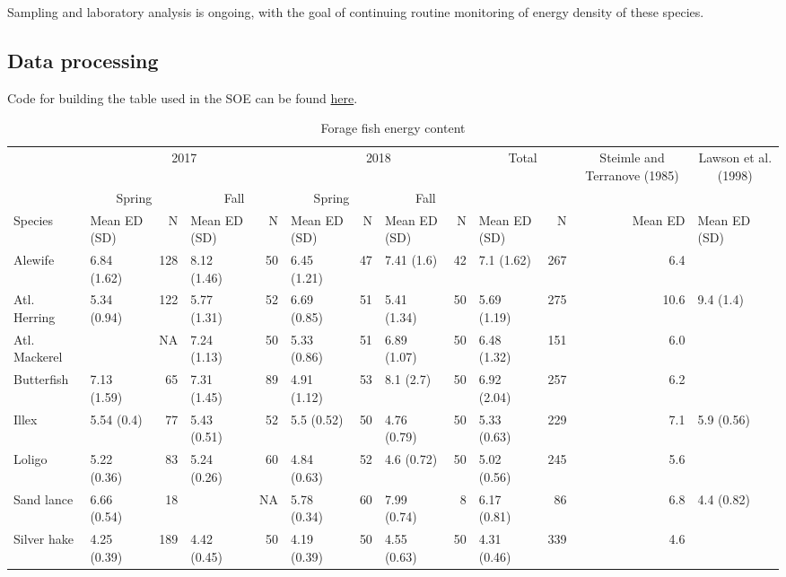 \documentclass[
]{book}
\begin{document}
Sampling and laboratory analysis is ongoing, with the goal of continuing routine monitoring of energy density of these species.

\hypertarget{data-processing-11}{%
\subsection{Data processing}\label{data-processing-11}}

Code for building the table used in the SOE can be found
\href{https://github.com/NOAA-EDAB/ecodata/blob/master/chunk-scripts/macrofauna.Rmd-forage.R}{here}.

\begin{table}

\caption{\label{tab:tab}Forage fish energy content}
\centering
\fontsize{9}{11}\selectfont
\begin{tabular}[t]{l|l|r|l|r|l|r|l|r|l|r|r|l}
\hline
\multicolumn{1}{c|}{ } & \multicolumn{4}{c|}{2017} & \multicolumn{4}{c|}{2018} & \multicolumn{2}{c|}{Total} & \multicolumn{1}{c|}{Steimle and Terranove (1985)} & \multicolumn{1}{c}{Lawson et al. (1998)} \\
\cline{2-5} \cline{6-9} \cline{10-11} \cline{12-12} \cline{13-13}
\multicolumn{1}{c|}{ } & \multicolumn{2}{c|}{Spring} & \multicolumn{2}{c|}{Fall} & \multicolumn{2}{c|}{Spring} & \multicolumn{2}{c|}{Fall} & \multicolumn{4}{c}{ } \\
\cline{2-3} \cline{4-5} \cline{6-7} \cline{8-9}
Species & Mean ED (SD) & N & Mean ED (SD) & N & Mean ED (SD) & N & Mean ED (SD) & N & Mean ED (SD) & N & Mean ED & Mean ED (SD)\\
\hline
Alewife & 6.84 (1.62) & 128 & 8.12 (1.46) & 50 & 6.45 (1.21) & 47 & 7.41 (1.6) & 42 & 7.1 (1.62) & 267 & 6.4 & \\
\hline
Atl. Herring & 5.34 (0.94) & 122 & 5.77 (1.31) & 52 & 6.69 (0.85) & 51 & 5.41 (1.34) & 50 & 5.69 (1.19) & 275 & 10.6 & 9.4 (1.4)\\
\hline
Atl. Mackerel &  & NA & 7.24 (1.13) & 50 & 5.33 (0.86) & 51 & 6.89 (1.07) & 50 & 6.48 (1.32) & 151 & 6.0 & \\
\hline
Butterfish & 7.13 (1.59) & 65 & 7.31 (1.45) & 89 & 4.91 (1.12) & 53 & 8.1 (2.7) & 50 & 6.92 (2.04) & 257 & 6.2 & \\
\hline
Illex & 5.54 (0.4) & 77 & 5.43 (0.51) & 52 & 5.5 (0.52) & 50 & 4.76 (0.79) & 50 & 5.33 (0.63) & 229 & 7.1 & 5.9 (0.56)\\
\hline
Loligo & 5.22 (0.36) & 83 & 5.24 (0.26) & 60 & 4.84 (0.63) & 52 & 4.6 (0.72) & 50 & 5.02 (0.56) & 245 & 5.6 & \\
\hline
Sand lance & 6.66 (0.54) & 18 &  & NA & 5.78 (0.34) & 60 & 7.99 (0.74) & 8 & 6.17 (0.81) & 86 & 6.8 & 4.4 (0.82)\\
\hline
Silver hake & 4.25 (0.39) & 189 & 4.42 (0.45) & 50 & 4.19 (0.39) & 50 & 4.55 (0.63) & 50 & 4.31 (0.46) & 339 & 4.6 & \\
\hline
\end{tabular}
\end{table}
\end{document}
